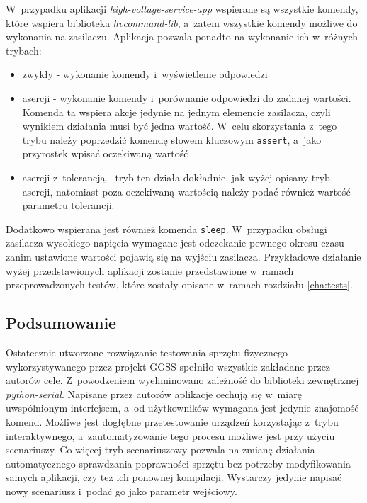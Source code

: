 W~przypadku aplikacji \emph{high-voltage-service-app} wspierane są wszystkie komendy, które wspiera biblioteka \emph{hvcommand-lib}, a~zatem wszystkie komendy możliwe do wykonania na zasilaczu. Aplikacja pozwala ponadto na wykonanie ich w~różnych trybach:
\begin{itemize}
    \item zwykły - wykonanie komendy i~wyświetlenie odpowiedzi
    \item asercji - wykonanie komendy i~porównanie odpowiedzi do zadanej wartości. Komenda ta wspiera akcje jedynie na jednym elemencie zasilacza, czyli wynikiem działania musi być jedna wartość. W~celu skorzystania z~tego trybu należy poprzedzić komendę słowem kluczowym \lstinline{assert}, a~jako przyrostek wpisać oczekiwaną wartość
    \item asercji z~tolerancją - tryb ten działa dokładnie, jak wyżej opisany tryb asercji, natomiast poza oczekiwaną wartością należy podać również wartość parametru tolerancji.
\end{itemize}
Dodatkowo wspierana jest również komenda \lstinline{sleep}. W~przypadku obsługi zasilacza wysokiego napięcia wymagane jest odczekanie pewnego okresu czasu zanim ustawione wartości pojawią się na wyjściu zasilacza. Przykładowe działanie wyżej przedstawionych aplikacji zostanie przedstawione w~ramach przeprowadzonych testów, które zostały opisane w~ramach rozdziału \ref{cha:tests}.

\subsection{Podsumowanie}
Ostatecznie utworzone rozwiązanie testowania sprzętu fizycznego wykorzystywanego przez projekt GGSS spełniło wszystkie zakładane przez autorów cele. Z~powodzeniem wyeliminowano zależność do biblioteki zewnętrznej \emph{python-serial}. Napisane przez autorów aplikacje cechują się w~miarę uwspólnionym interfejsem, a~od użytkowników wymagana jest jedynie znajomość komend. Możliwe jest dogłębne przetestowanie urządzeń korzystając z~trybu interaktywnego, a~zautomatyzowanie tego procesu możliwe jest przy użyciu scenariuszy. Co więcej tryb scenariuszowy pozwala na zmianę działania automatycznego sprawdzania poprawności sprzętu bez potrzeby modyfikowania samych aplikacji, czy też ich ponownej kompilacji. Wystarczy jedynie napisać nowy scenariusz i~podać go jako parametr wejściowy.